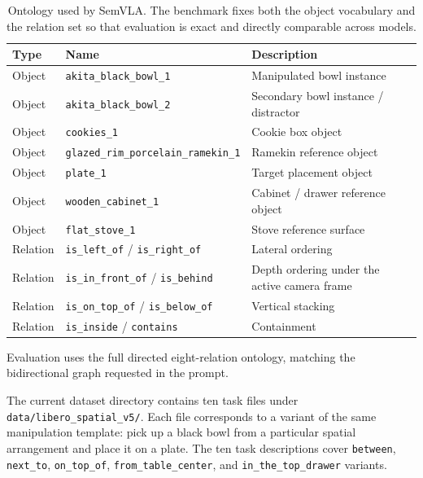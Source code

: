 \documentclass{article}
\begin{document}
\begin{table}[t]
    \caption{Ontology used by SemVLA. The benchmark fixes both the object vocabulary and the relation set so that evaluation is exact and directly comparable across models.}
    \label{tab:ontology}
    \centering
    \begin{tabularx}{\linewidth}{llX}
        \toprule
        Type & Name & Description \\
        \midrule
        Object & \texttt{akita\_black\_bowl\_1} & Manipulated bowl instance \\
        Object & \texttt{akita\_black\_bowl\_2} & Secondary bowl instance / distractor \\
        Object & \texttt{cookies\_1} & Cookie box object \\
        Object & \texttt{glazed\_rim\_porcelain\_ramekin\_1} & Ramekin reference object \\
        Object & \texttt{plate\_1} & Target placement object \\
        Object & \texttt{wooden\_cabinet\_1} & Cabinet / drawer reference object \\
        Object & \texttt{flat\_stove\_1} & Stove reference surface \\
        \midrule
        Relation & \texttt{is\_left\_of} / \texttt{is\_right\_of} & Lateral ordering \\
        Relation & \texttt{is\_in\_front\_of} / \texttt{is\_behind} & Depth ordering under the active camera frame \\
        Relation & \texttt{is\_on\_top\_of} / \texttt{is\_below\_of} & Vertical stacking \\
        Relation & \texttt{is\_inside} / \texttt{contains} & Containment \\
        \bottomrule
    \end{tabularx}
\end{table}

Evaluation uses the full directed eight-relation ontology, matching the bidirectional graph requested in the prompt.

The current dataset directory contains ten task files under \texttt{data/libero\_spatial\_v5/}. Each file corresponds to a variant of the same manipulation template: pick up a black bowl from a particular spatial arrangement and place it on a plate. The ten task descriptions cover \texttt{between}, \texttt{next\_to}, \texttt{on\_top\_of}, \texttt{from\_table\_center}, and \texttt{in\_the\_top\_drawer} variants.
\end{document}
